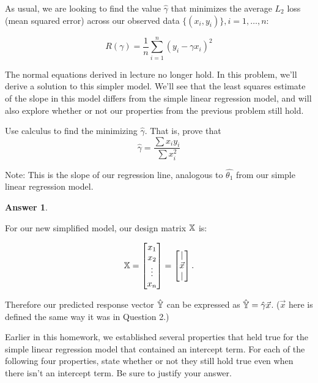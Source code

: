 \documentclass[addpoints, 12pt]{exam}
\theoremstyle{definition}
\newtheorem*{answer}{Answer}
\begin{document}
\noindent As usual, we are looking to find the value $\hat{\gamma}$ that minimizes the average $L_2$ loss (mean squared error) across our observed data $\{(x_i, y_i)\}, i = 1, \ldots, n$:

$$R(\gamma) = \frac{1}{n}\sum_{i=1}^n (y_i - \gamma x_i)^2$$

\noindent The normal equations derived in lecture no longer hold. In this problem, we'll derive a solution to this simpler model. We'll see that the least squares estimate of the slope in this model differs from the simple linear regression model, and will also explore whether or not our properties from the previous problem still hold.

\begin{questions}
    \setcounter{question}{2} %
\question[4] Use calculus to find the minimizing $\hat{\gamma}$.
That is, prove that 
$$ \hat{\gamma} = \frac{\sum x_iy_i}{\sum x_i^2}$$

Note: This is the slope of our regression line, analogous to $\hat{\theta_1}$ from our simple linear regression model.
    \begin{shaded}
    \begin{answer}


    \end{answer}
    \end{shaded}


\newpage
\question[8] 

For our new simplified model, our design matrix $\Bbb{X}$ is:

$$\Bbb{X} = \begin{bmatrix} x_1 \\ x_2 \\ \vdots \\ x_n \end{bmatrix} = \begin{bmatrix} | \\ \vec{x} \\ | \end{bmatrix}.$$

Therefore our predicted response vector $\hat{\Bbb{Y}}$ can be expressed as $\hat{\Bbb{Y}} = \hat{\gamma} \vec{x}$. ($\vec{x}$ here is defined the same way it was in Question 2.) 

Earlier in this homework, we established several properties that held true for the simple linear regression model that contained an intercept term. For each of the following four properties, state whether or not they still hold true even when there isn't an intercept term. Be sure to justify your answer.


\end{questions}
\end{document}
